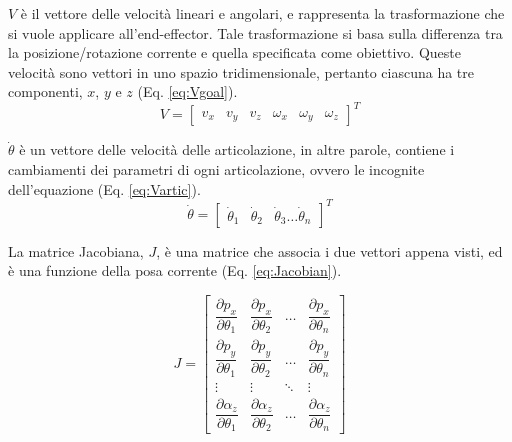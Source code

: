 $V$ è il vettore delle velocità lineari e angolari, e rappresenta la trasformazione che si vuole applicare all'end-effector.
Tale trasformazione si basa sulla differenza tra la posizione/rotazione corrente e quella specificata come obiettivo.
Queste velocità sono vettori in uno spazio tridimensionale, pertanto ciascuna ha tre componenti, $x$, $y$ e $z$ (Eq. \ref{eq:Vgoal}).
\begin{equation}\label{eq:Vgoal}
    V=
    \begin{bmatrix}
        v_x & v_y & v_z & \omega_x & \omega_y & \omega_z
    \end{bmatrix}
    ^T
\end{equation}

$\dot{\theta}$ è un vettore delle velocità delle articolazione, in altre parole, contiene i cambiamenti dei parametri di ogni articolazione, ovvero le incognite dell'equazione (Eq. \ref{eq:Vartic}).
\begin{equation}\label{eq:Vartic}
    \dot{\theta}=
    \begin{bmatrix}
        \dot{\theta}_1 & \dot{\theta}_2 & \dot{\theta}_3 \ldots \dot{\theta}_n
    \end{bmatrix}
    ^T
\end{equation}

La matrice Jacobiana, $J$, è una matrice che associa i due vettori appena visti, ed è una funzione della posa corrente (Eq. \ref{eq:Jacobian}).

\begin{equation}\label{eq:Jacobian}
    J=
    \begin{bmatrix}
        \dfrac{\partial p_x}{\partial \theta_1} & \dfrac{\partial p_x}{\partial \theta_2} & \dots & \dfrac{\partial p_x}{\partial \theta_n} \\[2ex]
        \dfrac{\partial p_y}{\partial \theta_1} & \dfrac{\partial p_y}{\partial \theta_2} & \dots & \dfrac{\partial p_y}{\partial \theta_n} \\[2ex]
        \vdots & \vdots & \ddots & \vdots \\[2ex]
        \dfrac{\partial \alpha_z}{\partial \theta_1} & \dfrac{\partial \alpha_z}{\partial \theta_2} & \dots & \dfrac{\partial \alpha_z}{\partial \theta_n} 
    \end{bmatrix}
\end{equation}

